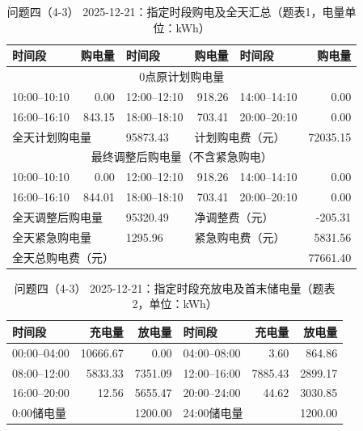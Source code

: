 \FloatBarrier
\begin{table}[H]
\centering\footnotesize
\setlength{\tabcolsep}{4pt}
\caption{问题四（4-3） 2025-12-21：指定时段购电及全天汇总（题表1，电量单位：kWh）}
\label{tab:required-q43-2025-12-21-grid}
\begin{tabular}{@{}lrlrlr@{}}
\toprule
时间段 & 购电量 & 时间段 & 购电量 & 时间段 & 购电量 \\
\midrule
\multicolumn{6}{c}{0点原计划购电量} \\
10:00--10:10 & 0.00 & 12:00--12:10 & 918.26 & 14:00--14:10 & 0.00 \\
16:00--16:10 & 843.15 & 18:00--18:10 & 703.41 & 20:00--20:10 & 0.00 \\
\multicolumn{2}{l}{全天计划购电量} & 95873.43 & \multicolumn{2}{l}{计划购电费（元）} & 72035.15 \\
\multicolumn{6}{c}{最终调整后购电量（不含紧急购电）} \\
10:00--10:10 & 0.00 & 12:00--12:10 & 918.26 & 14:00--14:10 & 0.00 \\
16:00--16:10 & 844.01 & 18:00--18:10 & 703.41 & 20:00--20:10 & 0.00 \\
\multicolumn{2}{l}{全天调整后购电量} & 95320.49 & \multicolumn{2}{l}{净调整费（元）} & -205.31 \\
\multicolumn{2}{l}{全天紧急购电量} & 1295.96 & \multicolumn{2}{l}{紧急购电费（元）} & 5831.56 \\
\multicolumn{5}{l}{全天总购电费（元）} & 77661.40 \\
\bottomrule
\end{tabular}
\end{table}

\begin{table}[H]
\centering\footnotesize
\setlength{\tabcolsep}{4pt}
\caption{问题四（4-3） 2025-12-21：指定时段充放电及首末储电量（题表2，单位：kWh）}
\label{tab:required-q43-2025-12-21-storage}
\begin{tabular}{@{}lrrlrr@{}}
\toprule
时间段 & 充电量 & 放电量 & 时间段 & 充电量 & 放电量 \\
\midrule
00:00--04:00 & 10666.67 & 0.00 & 04:00--08:00 & 3.60 & 864.86 \\
08:00--12:00 & 5833.33 & 7351.09 & 12:00--16:00 & 7885.43 & 2899.17 \\
16:00--20:00 & 12.56 & 5655.47 & 20:00--24:00 & 44.62 & 3030.85 \\
\multicolumn{2}{l}{0:00储电量} & 1200.00 & \multicolumn{2}{l}{24:00储电量} & 1200.00 \\
\bottomrule
\end{tabular}
\end{table}

